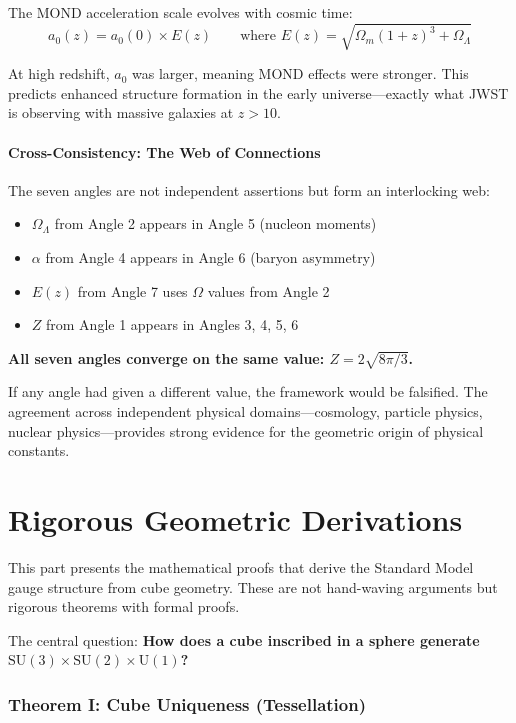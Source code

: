 \documentclass[11pt,a4paper]{article}
\theoremstyle{plain}
\theoremstyle{definition}
\theoremstyle{remark}
\newcommand{\Omegam}{\Omega_m}
\newcommand{\OmegaL}{\Omega_\Lambda}
\newcommand{\SUthree}{\text{SU}(3)}
\newcommand{\SUtwo}{\text{SU}(2)}
\newcommand{\Uone}{\text{U}(1)}
\begin{document}
The MOND acceleration scale evolves with cosmic time:
\[
a_0(z) = a_0(0) \times E(z) \qquad \text{where } E(z) = \sqrt{\Omegam(1+z)^3 + \OmegaL}
\]

At high redshift, $a_0$ was larger, meaning MOND effects were stronger. This predicts enhanced structure formation in the early universe---exactly what JWST is observing with massive galaxies at $z > 10$.

\subsection{Cross-Consistency: The Web of Connections}

The seven angles are not independent assertions but form an interlocking web:
\begin{itemize}
  \item $\OmegaL$ from Angle 2 appears in Angle 5 (nucleon moments)
  \item $\alpha$ from Angle 4 appears in Angle 6 (baryon asymmetry)
  \item $E(z)$ from Angle 7 uses $\Omega$ values from Angle 2
  \item $Z$ from Angle 1 appears in Angles 3, 4, 5, 6
\end{itemize}

\textbf{All seven angles converge on the same value: $Z = 2\sqrt{8\pi/3}$.}

If any angle had given a different value, the framework would be falsified. The agreement across independent physical domains---cosmology, particle physics, nuclear physics---provides strong evidence for the geometric origin of physical constants.

\part{Rigorous Geometric Derivations}

This part presents the mathematical proofs that derive the Standard Model gauge structure from cube geometry. These are not hand-waving arguments but rigorous theorems with formal proofs.

The central question: \textbf{How does a cube inscribed in a sphere generate $\SUthree \times \SUtwo \times \Uone$?}

\section{Theorem I: Cube Uniqueness (Tessellation)}
\end{document}
